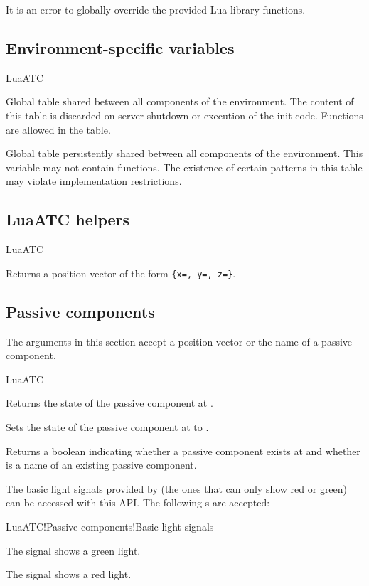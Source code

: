 It is an error to globally override the provided Lua library functions.

\subsection{Environment-specific variables}
\begin{apidoc}{LuaATC}
\item {} Global table shared between all components of the environment. The content of this table is discarded on server shutdown or execution of the init code. Functions are allowed in the table.
\item {} Global table persistently shared between all components of the environment. This variable may not contain functions. The existence of certain patterns in this table may violate implementation restrictions.
\end{apidoc}

\subsection{LuaATC helpers}
\begin{apidoc}{LuaATC}
\item {} Returns a position vector of the form \texttt{\{x=, y=, z=\}}.
\end{apidoc}

\subsection{Passive components}
The  arguments in this section accept a position vector or the name of a passive component.
\begin{apidoc}{LuaATC}
\item {} Returns the state of the passive component at .
\item {} Sets the state of the passive component at  to .
\item {} Returns a boolean indicating whether a passive component exists at  and whether  is a name of an existing passive component.
\end{apidoc}

The basic light signals provided by \advtrains{} (the ones that can only show red or green) can be accessed with this API. The following s are accepted:
\begin{apidoc}{LuaATC!Passive components!Basic light signals}
\item {} The signal shows a green light.
\item {} The signal shows a red light.
\end{apidoc}

